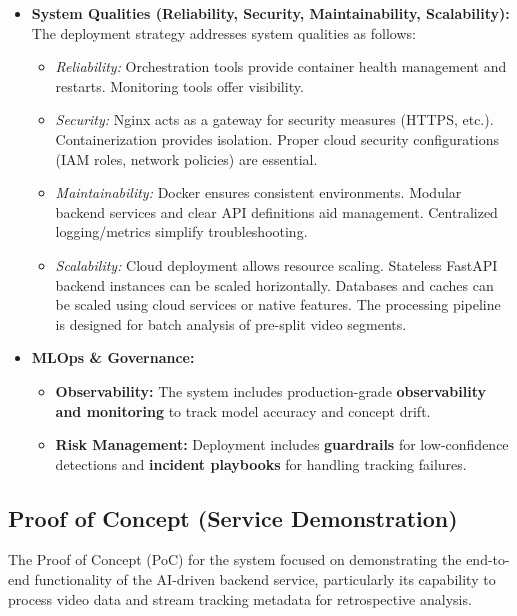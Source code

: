 \begin{itemize}
    \item \textbf{System Qualities (Reliability, Security, Maintainability, Scalability):}
        The deployment strategy addresses system qualities as follows:
        \begin{itemize}
            \item \textit{Reliability:} Orchestration tools provide container health management and restarts. Monitoring tools offer visibility.
            \item \textit{Security:} Nginx acts as a gateway for security measures (HTTPS, etc.). Containerization provides isolation. Proper cloud security configurations (IAM roles, network policies) are essential.
            \item \textit{Maintainability:} Docker ensures consistent environments. Modular backend services and clear API definitions aid management. Centralized logging/metrics simplify troubleshooting.
            \item \textit{Scalability:} Cloud deployment allows resource scaling. Stateless FastAPI backend instances can be scaled horizontally. Databases and caches can be scaled using cloud services or native features. The processing pipeline is designed for batch analysis of pre-split video segments.
        \end{itemize}
    \item \textbf{MLOps \& Governance:}
        \begin{itemize}
            \item \textbf{Observability:} The system includes production-grade \textbf{observability and monitoring} to track model accuracy and concept drift.
            \item \textbf{Risk Management:} Deployment includes \textbf{guardrails} for low-confidence detections and \textbf{incident playbooks} for handling tracking failures.
        \end{itemize}
\end{itemize}

\subsection{Proof of Concept (Service Demonstration)}
\label{subsection:poc_service_demo_new}
The Proof of Concept (PoC) for the \usevar{\srsTitle} system focused on demonstrating the end-to-end functionality of the AI-driven backend service, particularly its capability to process video data and stream tracking metadata for retrospective analysis.

